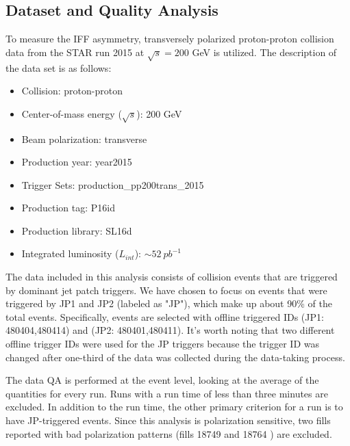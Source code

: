 \subsection{Dataset and Quality Analysis}
To measure the IFF asymmetry, transversely polarized proton-proton collision data  from the STAR run 2015 at $\sqrt{s}=200$ GeV is utilized. The description of the data set is as follows:
\begin{itemize}
    \item Collision: proton-proton
    \item Center-of-mass energy ($\sqrt{s}$): 200 GeV 
    \item Beam polarization: transverse
    \item Production year: year2015
    \item Trigger Sets: production\_pp200trans\_2015
    \item Production tag: P16id
    \item Production library: SL16d
    \item Integrated luminosity ($L_{int}$): $\sim 52\ pb^{-1}$
\end{itemize}
The data included in this analysis consists of collision events that are triggered by dominant jet patch triggers. We have chosen to focus on events that were triggered by JP1 and JP2 (labeled as "JP"), which make up about 90\% of the total events. Specifically, events are selected with offline triggered IDs (JP1: 480404,480414) and (JP2: 480401,480411). It's worth noting that two different offline trigger IDs were used for the JP triggers because the trigger ID was changed after one-third of the data was collected during the data-taking process.

The data QA is performed at the event level, looking at the average of the quantities for every run. Runs with a run time of less than three minutes are excluded. In addition to the run time, the other primary criterion for a run  is to have JP-triggered events. Since this analysis is polarization sensitive, two fills reported with bad polarization patterns (fills 18749 and 18764 ) are excluded.


